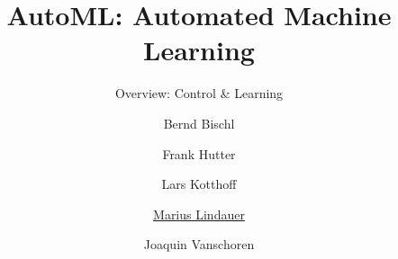 




\title[AutoML: Overview]{AutoML: Automated Machine Learning}
\subtitle{Overview: Control \& Learning}
\author[Marius Lindauer]{Bernd Bischl \and Frank Hutter \and Lars Kotthoff\newline \and \underline{Marius Lindauer} \and Joaquin Vanschoren}
\institute{}
\date{}





	
	\maketitle
	

